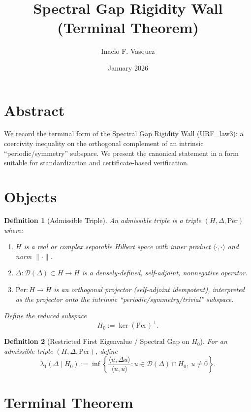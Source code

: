 \documentclass[11pt]{article}
\title{Spectral Gap Rigidity Wall (Terminal Theorem)}
\author{Inacio F. Vasquez}
\date{January 2026}
\newtheorem{definition}{Definition}
\begin{document}
\maketitle

\section*{Abstract}
We record the terminal form of the Spectral Gap Rigidity Wall (URF\_law3): a coercivity
inequality on the orthogonal complement of an intrinsic ``periodic/symmetry'' subspace.
We present the canonical statement in a form suitable for standardization and
certificate-based verification.

\section{Objects}

\begin{definition}[Admissible Triple]
An \emph{admissible triple} is a triple $(H,\Delta,\mathrm{Per})$ where:
\begin{enumerate}[label=(\roman*)]
\item $H$ is a real or complex separable Hilbert space with inner product $\langle \cdot,\cdot\rangle$
      and norm $\|\cdot\|$.
\item $\Delta:\mathcal D(\Delta)\subset H\to H$ is a densely-defined, self-adjoint, nonnegative operator.
\item $\mathrm{Per}:H\to H$ is an orthogonal projector (self-adjoint idempotent), interpreted as the
      projector onto the intrinsic ``periodic/symmetry/trivial'' subspace.
\end{enumerate}
Define the reduced subspace
\[
H_0 := \ker(\mathrm{Per})^\perp.
\]
\end{definition}

\begin{definition}[Restricted First Eigenvalue / Spectral Gap on $H_0$]
For an admissible triple $(H,\Delta,\mathrm{Per})$, define
\[
\lambda_1(\Delta\mid H_0)
:= \inf\left\{
\frac{\langle u,\Delta u\rangle}{\langle u,u\rangle} :
u\in \mathcal D(\Delta)\cap H_0,\ u\neq 0
\right\}.
\]
\end{definition}

\section{Terminal Theorem}
\end{document}
